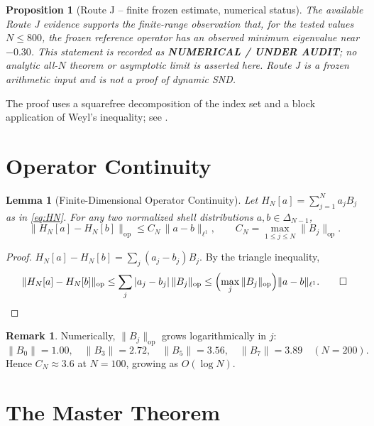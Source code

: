 \documentclass[12pt]{amsart}
\newtheorem{lemma}[theorem]{Lemma}
\newtheorem{proposition}[theorem]{Proposition}
\theoremstyle{definition}
\newtheorem{remark}[theorem]{Remark}
\begin{document}
\begin{proposition}[Route J -- finite frozen estimate, numerical status]
\label{thm:routeJ}
The available Route J evidence supports the finite-range observation
that, for the tested values $N\le 800$, the frozen reference operator
has an observed minimum eigenvalue near $-0.30$.  This statement is
recorded as \textbf{NUMERICAL / UNDER AUDIT}; no analytic all-$N$
theorem or asymptotic limit is asserted here.  Route J is a frozen
arithmetic input and is not a proof of dynamic SND.
\end{proposition}

\noindent
The proof uses a squarefree decomposition of the index set and
a block application of Weyl's inequality; see \cite{Simons2026a}.

\section{Operator Continuity}
\label{sec:lipschitz}

\begin{tcolorbox}[provedbox]
\begin{lemma}[Finite-Dimensional Operator Continuity]
\label{lem:continuity}
Let $H_N[a]=\sum_{j=1}^N a_j B_j$ as in \eqref{eq:HN}.
For any two normalized shell distributions $a,b\in\Delta_{N-1}$,
\[
\|H_N[a]-H_N[b]\|_{\mathrm{op}}
\le C_N\,\|a-b\|_{\ell^1},
\qquad
C_N = \max_{1\le j\le N}\|B_j\|_{\mathrm{op}}.
\]
\end{lemma}

\begin{proof}
$H_N[a]-H_N[b]=\sum_j(a_j-b_j)B_j$.
By the triangle inequality,
\[
\|H_N[a]-H_N[b]\|_{\mathrm{op}}
\le\sum_j|a_j-b_j|\,\|B_j\|_{\mathrm{op}}
\le\Bigl(\max_j\|B_j\|_{\mathrm{op}}\Bigr)\|a-b\|_{\ell^1}.\qquad\square
\]
\end{proof}
\end{tcolorbox}

\begin{remark}
Numerically, $\|B_j\|_{\mathrm{op}}$ grows logarithmically in $j$:
\[
\|B_0\|=1.00,\quad\|B_3\|=2.72,\quad\|B_5\|=3.56,\quad\|B_7\|=3.89
\quad(N=200).
\]
Hence $C_N\approx3.6$ at $N=100$, growing as $O(\log N)$.
\end{remark}

\section{The Master Theorem}
\label{sec:master}
\end{document}
